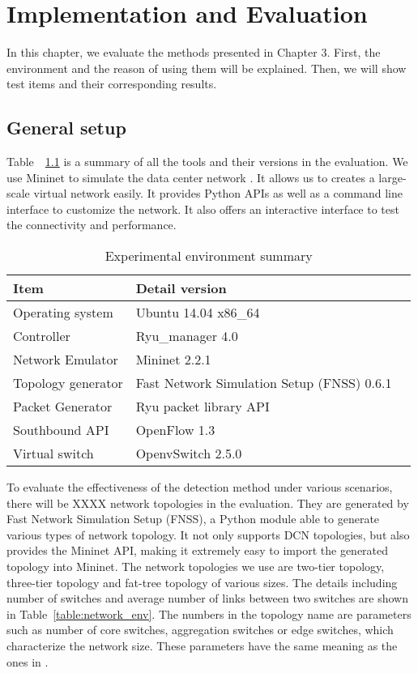\chapter{Implementation and Evaluation}
\label{Implementation_and_Evaluation}
In this chapter, we evaluate the methods presented in Chapter 3. First, the environment and the reason of using them will be explained. Then, we will show test items and their corresponding results.

\section{General setup}
Table~~\ref{table:Experiment_table} is a summary of all the tools and their versions in the evaluation. We use Mininet to simulate the data center network \cite{Mininet}. It allows us to creates a large-scale virtual network easily. It provides Python APIs as well as a command line interface to customize the network. It also offers an interactive interface to test the connectivity and performance.

\begin{table}[H]
\centering
\caption{Experimental environment summary}
\begin{tabular}{|l|p{4cm}|p{4.5cm}}
\hline Item & Detail version \\
\hline
\hline Operating system & Ubuntu 14.04 x86\_64 \\
\hline Controller & Ryu\_manager 4.0 \\
\hline Network Emulator & Mininet 2.2.1 \\
\hline Topology generator & Fast Network Simulation Setup (FNSS) 0.6.1\\
\hline Packet Generator & Ryu packet library API \\
\hline Southbound API & OpenFlow 1.3 \\
\hline Virtual switch & OpenvSwitch 2.5.0 \\
\hline 
\end{tabular}
\label{table:Experiment_table}
\end{table}

To evaluate the effectiveness of the detection method under various scenarios, there will be XXXX network topologies in the evaluation. They are generated by Fast Network Simulation Setup (FNSS), a Python module able to generate various types of network topology. It not only supports DCN topologies, but also provides the Mininet API, making it extremely easy to import the generated topology into Mininet. The network topologies we use are two-tier topology, three-tier topology and fat-tree topology of various sizes. The details including number of switches and average number of links between two switches are shown in Table~\ref{table:network_env}. The numbers in the topology name are parameters such as number of core switches, aggregation switches or edge switches, which characterize the network size. These parameters have the same meaning as the ones in \cite{FNSS}.

